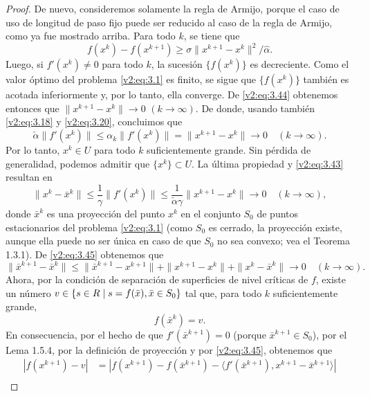 \begin{proof}
    De nuevo, consideremos solamente la regla de Armijo, porque el caso de uso de longitud de paso fijo puede ser reducido al caso de la regla de Armijo, como ya fue mostrado arriba.
    Para todo $k$, se tiene que
    \begin{equation}
        f(x^k) - f(x^{k+1}) \ge \sigma \|x^{k+1} - x^k\|^2/\hat{\alpha}.
        \label{v2:eq:3.44}
    \end{equation}
    Luego, si $f'(x^k) \neq 0$ para todo $k$, la sucesión $\{f(x^k)\}$ es decreciente. Como el valor óptimo del problema \eqref{v2:eq:3.1} es finito, se sigue que $\{f(x^k)\}$ también es acotada inferiormente y, por lo tanto, ella converge. De \eqref{v2:eq:3.44} obtenemos entonces que $\|x^{k+1} - x^k\| \to 0$ $(k \to \infty)$. De donde, usando también \eqref{v2:eq:3.18} y \eqref{v2:eq:3.20}, concluimos que
    \[
        \check{\alpha}\|f'(x^k)\| \le \alpha_k\|f'(x^k)\| = \|x^{k+1} - x^k\| \to 0 \quad (k \to \infty).
    \]
    Por lo tanto, $x^k \in U$ para todo $k$ suficientemente grande. Sin pérdida de generalidad, podemos admitir que $\{x^k\} \subset U$. La última propiedad y \eqref{v2:eq:3.43} resultan en
    \begin{equation}
        \|x^k - \bar{x}^k\| \le \frac{1}{\gamma}\|f'(x^k)\| \le \frac{1}{\check{\alpha}\gamma}\|x^{k+1} - x^k\| \to 0 \quad (k \to \infty),
        \label{v2:eq:3.45}
    \end{equation}
    donde $\bar{x}^k$ es una proyección del punto $x^k$ en el conjunto $S_0$ de puntos estacionarios del problema \eqref{v2:eq:3.1} (como $S_0$ es cerrado, la proyección existe, aunque ella puede no ser única en caso de que $S_0$ no sea convexo; vea el Teorema 1.3.1).
    De \eqref{v2:eq:3.45} obtenemos que
    \[
        \|\bar{x}^{k+1} - \bar{x}^k\| \le \|\bar{x}^{k+1} - x^{k+1}\| + \|x^{k+1} - x^k\| + \|x^k - \bar{x}^k\| \to 0 \quad (k \to \infty).
    \]
    Ahora, por la condición de separación de superficies de nivel críticas de $f$, existe un número $v \in \{s \in R \mid s = f(\bar{x}), \bar{x} \in S_0\}$ tal que, para todo $k$ suficientemente grande,
    \begin{equation}
        f(\bar{x}^k) = v.
        \label{v2:eq:3.46}
    \end{equation}
    En consecuencia, por el hecho de que $f'(\bar{x}^{k+1}) = 0$ (porque $\bar{x}^{k+1} \in S_0$), por el Lema 1.5.4, por la definición de proyección y por \eqref{v2:eq:3.45}, obtenemos que
    \begin{align*}
        |f(x^{k+1}) - v| &= |f(x^{k+1}) - f(\bar{x}^{k+1}) - \langle f'(\bar{x}^{k+1}), x^{k+1} - \bar{x}^{k+1} \rangle| \\

\end{align*}
\end{proof}
